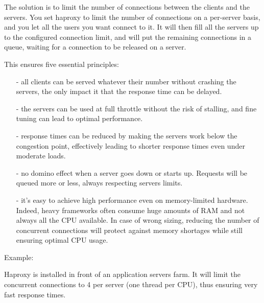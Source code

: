 The solution is to limit the number of connections between the clients and the
servers. You set haproxy to limit the number of connections on a per-server
basis, and you let all the users you want connect to it. It will then fill all
the servers up to the configured connection limit, and will put the remaining
connections in a queue, waiting for a connection to be released on a server.

This ensures five essential principles:

\begin{itemize}
\item[-] all clients can be served whatever their number without crashing the
    servers, the only impact it that the response time can be delayed.

\item[-] the servers can be used at full throttle without the risk of stalling,
    and fine tuning can lead to optimal performance.

\item[-] response times can be reduced by making the servers work below the
    congestion point, effectively leading to shorter response times even
    under moderate loads.

\item[-] no domino effect when a server goes down or starts up. Requests will be
    queued more or less, always respecting servers limits.

\item[-] it's easy to achieve high performance even on memory-limited hardware.
    Indeed, heavy frameworks often consume huge amounts of RAM and not always
    all the CPU available. In case of wrong sizing, reducing the number of
    concurrent connections will protect against memory shortages while still
    ensuring optimal CPU usage.
\end{itemize}

Example:

Haproxy is installed in front of an application servers farm. It will limit
the concurrent connections to 4 per server (one thread per CPU), thus ensuring
very fast response times.

